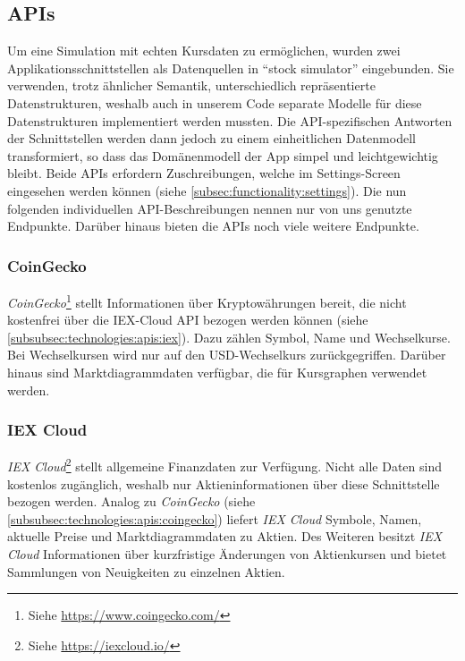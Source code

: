 \documentclass[a4paper]{article}
\begin{document}
\subsection{APIs}
\label{subsec:technologies:apis}
Um eine Simulation mit echten Kursdaten zu ermöglichen, wurden zwei Applikationsschnittstellen als Datenquellen in "`stock simulator"' eingebunden.
Sie verwenden, trotz ähnlicher Semantik, unterschiedlich repräsentierte Datenstrukturen, weshalb auch in unserem Code separate Modelle für diese Datenstrukturen implementiert werden mussten.
Die API-spezifischen Antworten der Schnittstellen werden dann jedoch zu einem einheitlichen Datenmodell transformiert, so dass das Domänenmodell der App simpel und leichtgewichtig bleibt.
Beide APIs erfordern Zuschreibungen, welche im Settings-Screen eingesehen werden können (siehe \autoref{subsec:functionality:settings}).
Die nun folgenden individuellen API-Beschreibungen nennen nur von uns genutzte Endpunkte. Darüber hinaus bieten die APIs noch viele weitere Endpunkte.


\subsubsection{CoinGecko}
\label{subsubsec:technologies:apis:coingecko}
\textit{CoinGecko}\footnote{Siehe \url{https://www.coingecko.com/}} stellt Informationen über Kryptowährungen bereit, die nicht kostenfrei über die IEX-Cloud API bezogen werden können (siehe \autoref{subsubsec:technologies:apis:iex}).
Dazu zählen Symbol, Name und Wechselkurse.
Bei Wechselkursen wird nur auf den USD-Wechselkurs zurückgegriffen.
Darüber hinaus sind Marktdiagrammdaten verfügbar, die für Kursgraphen verwendet werden.


\subsubsection{IEX Cloud}
\label{subsubsec:technologies:apis:iex}
\textit{IEX Cloud}\footnote{Siehe \url{https://iexcloud.io/}} stellt allgemeine Finanzdaten zur Verfügung.
Nicht alle Daten sind kostenlos zugänglich, weshalb nur Aktieninformationen über diese Schnittstelle bezogen werden.
Analog zu \textit{CoinGecko} (siehe \autoref{subsubsec:technologies:apis:coingecko}) liefert \textit{IEX Cloud} Symbole, Namen, aktuelle Preise und Marktdiagrammdaten zu Aktien.
Des Weiteren besitzt \textit{IEX Cloud} Informationen über kurzfristige Änderungen von Aktienkursen und bietet Sammlungen von Neuigkeiten zu einzelnen Aktien.
\end{document}
